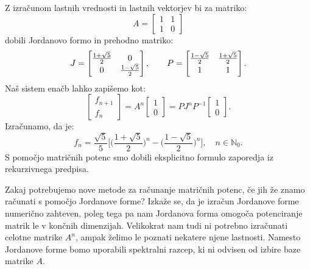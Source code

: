 \documentclass[mat1]{fmfdelo}
\begin{document}
\begin{zgled} 
    Z izračunom lastnih vrednosti in lastnih vektorjev bi za matriko:
    \begin{equation*}
        A = 
        \begin{bmatrix}
            1 & 1 \\
            1 & 0
        \end{bmatrix}
    \end{equation*}
    dobili Jordanovo formo in prehodno matriko:
    \begin{equation*}
        J = 
        \begin{bmatrix}
                \frac{1+\sqrt{5}}{2} & 0 \\
            0 &  \frac{1-\sqrt{5}}{2}
        \end{bmatrix}
        ,\quad \quad
        P = 
        \begin{bmatrix}
            \frac{1-\sqrt{5}}{2} &  \frac{1+\sqrt{5}}{2} \vspace{2pt} \\
            1 & 1
        \end{bmatrix}.
    \end{equation*}
    Naš sistem enačb lahko zapišemo kot:
    \begin{equation*}
        \begin{bmatrix}
            f_{n+1} \\
            f_n
        \end{bmatrix}
        =
        A^n
        \begin{bmatrix}
            1 \\
            0
        \end{bmatrix}
        = PJ^n P^{-1}
        \begin{bmatrix}
            1 \\
            0
        \end{bmatrix}.
    \end{equation*}
    Izračunamo, da je:
    \begin{equation*}
        f_n = \frac{\sqrt{5}}{5}\Big[ \Big(\frac{1+\sqrt{5}}{2}\Big)^n - \Big(\frac{1-\sqrt{5}}{2}\Big)^n \Big], \quad n \in \mathbb{N}_0.
    \end{equation*}
    S pomočjo matričnih potenc smo dobili eksplicitno formulo zaporedja iz rekurzivnega predpisa.
\end{zgled}

Zakaj potrebujemo nove metode za računanje matričnih potenc, če jih že znamo računati s pomočjo Jordanove forme? Izkaže se, da je izračun Jordanove forme numerično zahteven, poleg tega pa nam Jordanova forma omogoča potenciranje matrik le v končnih dimenzijah. Velikokrat nam tudi ni potrebno izračunati celotne matrike $A^n$, ampak želimo le poznati nekatere njene lastnosti. Namesto Jordanove forme bomo uporabili spektralni razcep, ki ni odvisen od izbire baze matrike $A$.
\end{document}
